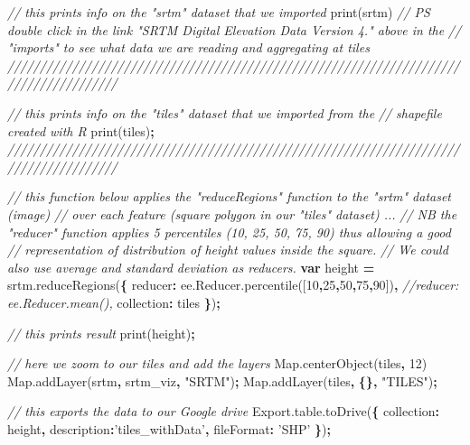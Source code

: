 \documentclass[]{article}
\newenvironment{Shaded}{\begin{snugshade}}{\end{snugshade}}
\newcommand{\AttributeTok}[1]{\textcolor[rgb]{0.77,0.63,0.00}{#1}}
\newcommand{\CommentTok}[1]{\textcolor[rgb]{0.56,0.35,0.01}{\textit{#1}}}
\newcommand{\DataTypeTok}[1]{\textcolor[rgb]{0.13,0.29,0.53}{#1}}
\newcommand{\DecValTok}[1]{\textcolor[rgb]{0.00,0.00,0.81}{#1}}
\newcommand{\KeywordTok}[1]{\textcolor[rgb]{0.13,0.29,0.53}{\textbf{#1}}}
\newcommand{\NormalTok}[1]{#1}
\newcommand{\OperatorTok}[1]{\textcolor[rgb]{0.81,0.36,0.00}{\textbf{#1}}}
\newcommand{\StringTok}[1]{\textcolor[rgb]{0.31,0.60,0.02}{#1}}
\newcommand{\VariableTok}[1]{\textcolor[rgb]{0.00,0.00,0.00}{#1}}
\begin{document}
\begin{Shaded}
\begin{Highlighting}[]
\CommentTok{// this prints info on the "srtm" dataset that we imported }
\AttributeTok{print}\NormalTok{(srtm)}
\CommentTok{// PS double click in the link "SRTM Digital Elevation Data Version 4." above in the}
\CommentTok{// "imports" to see what data we are reading and aggregating at tiles }
\CommentTok{///////////////////////////////////////////////////////////////////////////////////////}

\CommentTok{// this prints info on the "tiles" dataset that we imported from the }
\CommentTok{// shapefile created with R}
\AttributeTok{print}\NormalTok{(tiles)}\OperatorTok{;}
\CommentTok{///////////////////////////////////////////////////////////////////////////////////////}

\CommentTok{// this function below applies the "reduceRegions" function to the "srtm" dataset (image)}
\CommentTok{// over each feature (square polygon in our "tiles" dataset) ... }
\CommentTok{// NB the "reducer" function applies 5 percentiles (10, 25, 50, 75, 90) thus allowing a good}
\CommentTok{// representation of distribution of height values inside the square. }
\CommentTok{// We could also use average and standard deviation as reducers.}
\KeywordTok{var}\NormalTok{  height }\OperatorTok{=}  \VariableTok{srtm}\NormalTok{.}\AttributeTok{reduceRegions}\NormalTok{(}\OperatorTok{\{}
  \DataTypeTok{reducer}\OperatorTok{:} \VariableTok{ee}\NormalTok{.}\VariableTok{Reducer}\NormalTok{.}\AttributeTok{percentile}\NormalTok{([}\DecValTok{10}\OperatorTok{,}\DecValTok{25}\OperatorTok{,}\DecValTok{50}\OperatorTok{,}\DecValTok{75}\OperatorTok{,}\DecValTok{90}\NormalTok{])}\OperatorTok{,} 
  \CommentTok{//reducer: ee.Reducer.mean(), }
  \DataTypeTok{collection}\OperatorTok{:}\NormalTok{ tiles }
\OperatorTok{\}}\NormalTok{)}\OperatorTok{;} 

\CommentTok{// this prints result}
\AttributeTok{print}\NormalTok{(height)}\OperatorTok{;}

\CommentTok{// here we zoom to our tiles and add the layers}
\VariableTok{Map}\NormalTok{.}\AttributeTok{centerObject}\NormalTok{(tiles}\OperatorTok{,} \DecValTok{12}\NormalTok{)}
\VariableTok{Map}\NormalTok{.}\AttributeTok{addLayer}\NormalTok{(srtm}\OperatorTok{,}\NormalTok{ srtm_viz}\OperatorTok{,} \StringTok{"SRTM"}\NormalTok{)}\OperatorTok{;}
\VariableTok{Map}\NormalTok{.}\AttributeTok{addLayer}\NormalTok{(tiles}\OperatorTok{,} \OperatorTok{\{\},} \StringTok{"TILES"}\NormalTok{)}\OperatorTok{;}

\CommentTok{// this exports the data to our Google drive}
 \VariableTok{Export}\NormalTok{.}\VariableTok{table}\NormalTok{.}\AttributeTok{toDrive}\NormalTok{(}\OperatorTok{\{}
    \DataTypeTok{collection}\OperatorTok{:}\NormalTok{ height}\OperatorTok{,}
    \DataTypeTok{description}\OperatorTok{:}\StringTok{'tiles_withData'}\OperatorTok{,}
    \DataTypeTok{fileFormat}\OperatorTok{:} \StringTok{'SHP'}
  \OperatorTok{\}}\NormalTok{)}\OperatorTok{;}
\end{Highlighting}
\end{Shaded}
\end{document}
